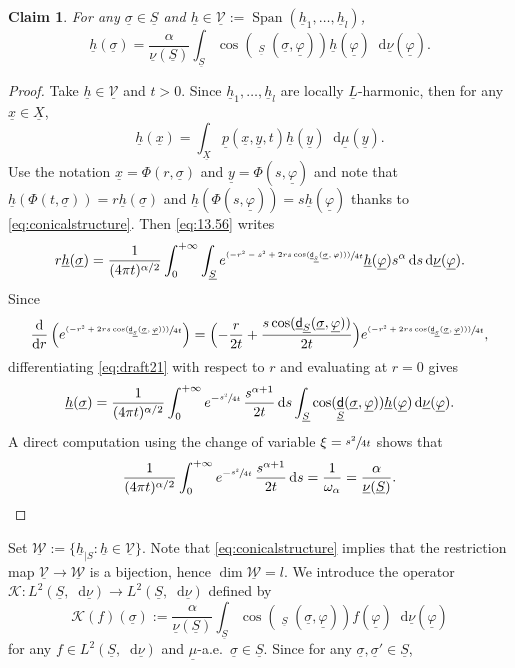\documentclass[JEP,XML,SOM,Unicode,published]{cedram}
\newcommand{\psfrac}[2]{\sfrac{(#1)}{#2}}
\let\sep:
\theoremstyle{plain}
\newtheorem{claim}[theorem]{Claim}
\theoremstyle{definition}
\newcommand{\ucV}{\underline{\mathcal{V}}}
\newcommand{\cW}{\underline{\mathcal{W}}}
\let\phi\varphi
\newcommand{\di}{\mathop{}\!\mathrm{d}}
\newcommand{\dist}{\mathsf{d}}
\DeclareMathOperator{\Span}{Span}
\newcommand{\uX}{\underline{X}}
\newcommand{\usigma}{\underline{\sigma}}
\DeclareMathOperator{\udist}{\underline{\dist}}
\newcommand{\ux}{\underline{x}}
\newcommand{\uL}{\underline{L}}
\newcommand{\uphi}{\underline{\phi}}
\newcommand{\uS}{\underline{S}}
\newcommand{\umu}{\underline{\mu}}
\newcommand{\unu}{\underline{\nu}}
\newcommand{\uy}{\underline{y}}
\newcommand{\upp}{\underline{p}}
\newcommand{\uh}{\underline{h}}
\begin{document}
\begin{claim}
For any $\usigma \in \uS$ and $\uh \in \ucV:=\Span(\uh_1,\dots,\uh_l)$,
\begin{equation}\label{proK}
\uh(\usigma) = \frac{\alpha}{\unu(\uS)} \int_{\uS} \cos(\udist_{\uS}(\usigma,\uphi)) \uh(\uphi) \di \unu(\uphi).
\end{equation}
\end{claim}

\begin{proof}
Take $\uh \in \ucV$ and $t>0$. Since $\uh_1,\dots,\uh_l$ are locally $\uL$-harmonic, then for any $\ux \in \uX$,
\begin{equation}\label{eq:13.56}
\uh(\ux) = \int_{\uX} \upp(\ux,\uy,t)\uh(\uy)\di\umu(\uy).
\end{equation}
Use the notation $\ux = \Phi(r,\usigma)$ and $\uy=\Phi(s,\uphi)$ and note that $\uh(\Phi(t,\usigma)) = r \uh(\usigma)$ and $\uh(\Phi(s,\uphi)) = s \uh(\uphi)$ thanks to \eqref{eq:conicalstructure}. Then \eqref{eq:13.56} writes
\begin{equation}\label{eq:draft21}
r \uh(\usigma)=\frac{1}{(4\pi t)^{\alpha/2}}\int_0^{+\infty} \int_{\uS} e^{\psfrac{-r^2-s^2+2rs\cos(\udist_{\uS}(\usigma,\phi))}{4t}}\uh(\uphi)s^\alpha\di s \di \unu(\uphi).
\end{equation}
Since
\[
\frac{\di}{\di r} \left(e^{\psfrac{-r^2+2rs\cos(\udist_{\uS}(\usigma,\uphi))}{4t}}\right) = \Bigl(- \frac{r}{2t} + \frac{s\cos(\udist_{\uS}(\usigma,\uphi))}{2t}\Bigr)e^{\psfrac{-r^2+2rs\cos(\udist_{\uS}(\usigma,\uphi))}{4t}},
\]
differentiating \eqref{eq:draft21} with respect to $r$ and evaluating at $r=0$ gives
\[
\uh(\usigma) = \frac{1}{(4\pi t)^{\alpha/2}} \int_0^{+\infty} e^{-\sfrac{s^2}{4t}}\,\frac{s^{\alpha+1}}{2t} \di s \int_{\uS} \cos(\udist_{\uS}(\usigma,\uphi)) \uh(\uphi) \di \unu(\uphi).
\]
A direct computation using the change of variable $\xi=\sfrac{s^2}{4t}$ shows that
\[
\frac{1}{(4\pi t)^{\alpha/2}} \int_0^{+\infty} e^{-\sfrac{s^2}{4t}}\,\frac{s^{\alpha+1}}{2t} \di s = \frac{1}{\omega_\alpha} = \frac{\alpha}{\unu(\uS)}.\qedhere
\]
\end{proof}
Set $\cW:=\{\uh_{|S} \sep \uh \in \ucV\}$. Note that \eqref{eq:conicalstructure} implies that the restriction map $\ucV\to \cW$ is a bijection, hence $\dim \cW=l$. We introduce the operator
$\mathcal{K}\colon L^2(\uS,\di\unu)\to L^2(\uS,\di\unu)$ defined by
\[
\mathcal{K}(f)(\usigma):= \frac{\alpha}{\unu(\uS)} \int_{\uS} \cos(\udist_{\uS}(\usigma,\uphi)) f(\uphi) \di \unu(\uphi)
\]
for any $f \in L^2(\uS,\di\unu)$ and $\umu$-a.e.\ $\usigma \in \uS$. Since for any $\usigma,\usigma' \in \uS$,
\end{document}
